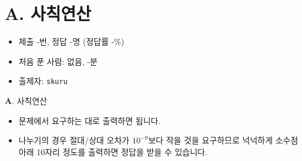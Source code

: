 \section{A. 사칙연산}

\begin{frame} %
    \begin{itemize}
        \item 제출 -번, 정답 -명 (정답률 -\%)
        \item 처음 푼 사람: 없음, -분
        \item 출제자: \texttt{skuru}
    \end{itemize}
\end{frame}

\begin{frame}{\textbf{A}. 사칙연산}
    \begin{itemize}
        \item 문제에서 요구하는 대로 출력하면 됩니다.
        \item 나누기의 경우 절대/상대 오차가 $10^{-9}$보다 작을 것을 요구하므로 넉넉하게 소수점 아래 10자리 정도를 출력하면 정답을 받을 수 있습니다.
    \end{itemize}
\end{frame}
